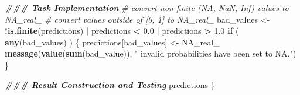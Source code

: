 \documentclass[
]{book}
\newenvironment{Shaded}{\begin{snugshade}}{\end{snugshade}}
\newcommand{\CommentTok}[1]{\textcolor[rgb]{0.56,0.35,0.01}{\textit{#1}}}
\newcommand{\ConstantTok}[1]{\textcolor[rgb]{0.56,0.35,0.01}{#1}}
\newcommand{\ControlFlowTok}[1]{\textcolor[rgb]{0.13,0.29,0.53}{\textbf{#1}}}
\newcommand{\DocumentationTok}[1]{\textcolor[rgb]{0.56,0.35,0.01}{\textbf{\textit{#1}}}}
\newcommand{\FloatTok}[1]{\textcolor[rgb]{0.00,0.00,0.81}{#1}}
\newcommand{\FunctionTok}[1]{\textcolor[rgb]{0.13,0.29,0.53}{\textbf{#1}}}
\newcommand{\NormalTok}[1]{#1}
\newcommand{\OtherTok}[1]{\textcolor[rgb]{0.56,0.35,0.01}{#1}}
\newcommand{\SpecialCharTok}[1]{\textcolor[rgb]{0.81,0.36,0.00}{\textbf{#1}}}
\newcommand{\StringTok}[1]{\textcolor[rgb]{0.31,0.60,0.02}{#1}}
\begin{document}
\begin{Shaded}
\begin{Highlighting}[]
  \DocumentationTok{\#\#\# Task Implementation}
  \CommentTok{\# convert non{-}finite (NA, NaN, Inf) values to NA\_real\_}
  \CommentTok{\# convert values outside of [0, 1] to NA\_real\_}
\NormalTok{  bad\_values }\OtherTok{\textless{}{-}} \SpecialCharTok{!}\FunctionTok{is.finite}\NormalTok{(predictions) }\SpecialCharTok{|}\NormalTok{ predictions }\SpecialCharTok{\textless{}} \FloatTok{0.0} \SpecialCharTok{|}\NormalTok{ predictions }\SpecialCharTok{\textgreater{}} \FloatTok{1.0}
  \ControlFlowTok{if}\NormalTok{ ( }\FunctionTok{any}\NormalTok{(bad\_values) ) \{}
\NormalTok{    predictions[bad\_values] }\OtherTok{\textless{}{-}} \ConstantTok{NA\_real\_}
    \FunctionTok{message}\NormalTok{(}\FunctionTok{value}\NormalTok{(}\FunctionTok{sum}\NormalTok{(bad\_value)), }\StringTok{" invalid probabilities have been set to NA."}\NormalTok{)}
\NormalTok{  \}}
  
  \DocumentationTok{\#\#\# Result Construction and Testing}
\NormalTok{  predictions}
\NormalTok{\}}


\end{Highlighting}
\end{Shaded}
\end{document}
